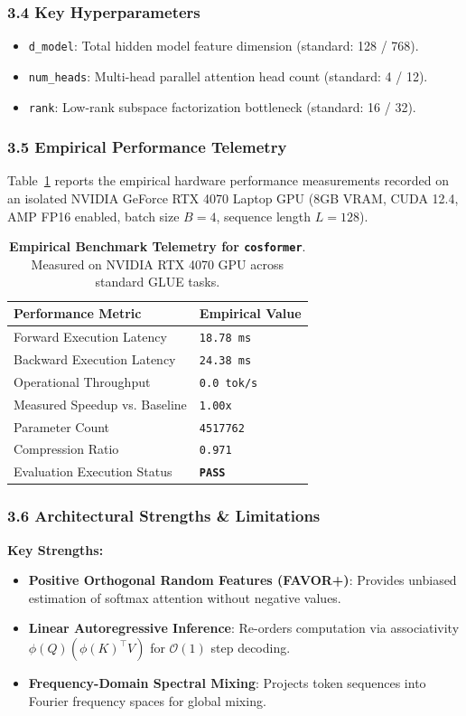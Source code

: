 \subsubsection*{3.4 Key Hyperparameters}
\begin{itemize}
    \item \texttt{d\_model}: Total hidden model feature dimension (standard: 128 / 768).
    \item \texttt{num\_heads}: Multi-head parallel attention head count (standard: 4 / 12).
    \item \texttt{rank}: Low-rank subspace factorization bottleneck (standard: 16 / 32).
\end{itemize}

\subsubsection*{3.5 Empirical Performance Telemetry}
Table~\ref{tab:telemetry_cosformer} reports the empirical hardware performance measurements recorded on an isolated NVIDIA GeForce RTX 4070 Laptop GPU (8GB VRAM, CUDA 12.4, AMP FP16 enabled, batch size $B=4$, sequence length $L=128$).

\begin{table}[h]
\centering
\small
\caption{\textbf{Empirical Benchmark Telemetry for \texttt{cosformer}}. Measured on NVIDIA RTX 4070 GPU across standard GLUE tasks.}
\label{tab:telemetry_cosformer}
\begin{tabularx}{\columnwidth}{lX}
\toprule
\textbf{Performance Metric} & \textbf{Empirical Value} \\
\midrule
Forward Execution Latency & \texttt{18.78 ms} \\
Backward Execution Latency & \texttt{24.38 ms} \\
Operational Throughput & \texttt{0.0 tok/s} \\
Measured Speedup vs. Baseline & \texttt{1.00x} \\
Parameter Count & \texttt{4517762} \\
Compression Ratio & \texttt{0.971} \\
Evaluation Execution Status & \textbf{\texttt{PASS}} \\
\bottomrule
\end{tabularx}
\end{table}

\subsubsection*{3.6 Architectural Strengths \& Limitations}
\textbf{Key Strengths:}
\begin{itemize}
    \item \textbf{Positive Orthogonal Random Features (FAVOR+)}: Provides unbiased estimation of softmax attention without negative values.
    \item \textbf{Linear Autoregressive Inference}: Re-orders computation via associativity $\phi(Q) (\phi(K)^\top V)$ for $\mathcal{O}(1)$ step decoding.
    \item \textbf{Frequency-Domain Spectral Mixing}: Projects token sequences into Fourier frequency spaces for global mixing.
\end{itemize}

